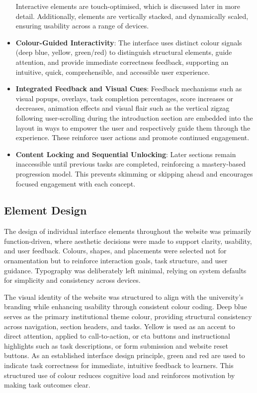 \begin{itemize}
    Interactive elements are touch-optimised, which is discussed later in more detail. 
    Additionally, elements are vertically stacked, and dynamically scaled, ensuring usability across a range of devices.
    \item \textbf{Colour-Guided Interactivity}:  The interface uses distinct colour signals (deep blue, yellow, green/red) to distinguish structural elements, guide attention, and provide immediate correctness feedback, supporting an intuitive, quick, comprehensible, and accessible user experience.
    \item \textbf{Integrated Feedback and Visual Cues}:  Feedback mechanisms such as visual popups, overlays, task completion percentages, score increases or decreases, animation effects and visual flair such as the vertical zigzag following user-scrolling during the introduction section are embedded into the layout in ways to empower the user and respectively guide them through the experience. 
    These reinforce user actions and promote continued engagement.
    \item \textbf{Content Locking and Sequential Unlocking}:  Later sections remain inaccessible until previous tasks are completed, reinforcing a mastery-based progression model. 
    This prevents skimming or skipping ahead and encourages focused engagement with each concept.
\end{itemize}

\subsection{Element Design}
The design of individual interface elements throughout the website was primarily function-driven, where aesthetic decisions were made to support clarity, usability, and user feedback. 
Colours, shapes, and placements were selected not for ornamentation but to reinforce interaction goals, task structure, and user guidance. 
Typography was deliberately left minimal, relying on system defaults for simplicity and consistency across devices.

The visual identity of the website was structured to align with the university's branding while enhancing usability through consistent colour coding. 
Deep blue serves as the primary institutional theme colour, providing structural consistency across navigation, section headers, and tasks. 
Yellow is used as an accent to direct attention, applied to call-to-action, or \acrshort{cta} buttons and instructional highlights such as task descriptions, or form submission and website reset buttons. 
As an established interface design principle, green and red are used to indicate task correctness for immediate, intuitive feedback to learners. 
This structured use of colour reduces cognitive load and reinforces motivation by making task outcomes clear.

